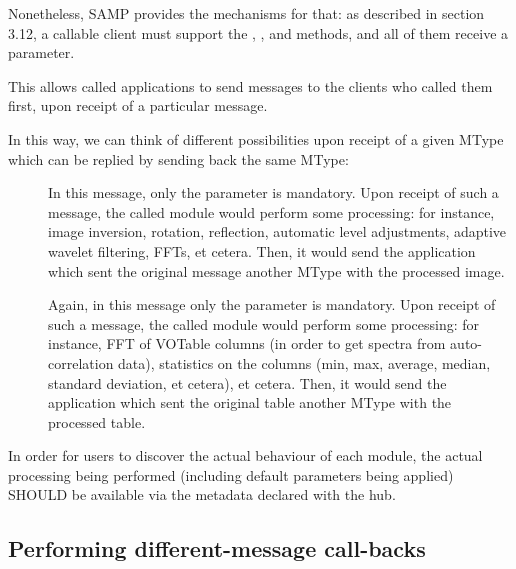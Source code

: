 			Nonetheless, SAMP provides the mechanisms for that:
			as described in section 3.12, a callable client must
			support the ,
			, and  methods, and
			all of them receive a  parameter.
			
			This allows called applications to send messages to
			the clients who called them first, upon receipt of a
			particular message.
			
			In this way, we can think of different possibilities
			upon receipt of a given MType which can be replied by
			sending back the same MType:
			
			\begin{description}
				\item[] In this message,
				only the  parameter is mandatory. Upon
				receipt of such a message, the called module would
				perform some processing: for instance, image
				inversion, rotation, reflection, automatic level
				adjustments, adaptive wavelet filtering, FFTs,
				et cetera. Then, it would send the application
				which sent the original message another
				 MType with the processed
				image.
				
				\item[] Again, in this
				message only the  parameter is
				mandatory. Upon receipt of such a message, the
				called module would perform some processing: for
				instance, FFT of VOTable columns (in order to
				get spectra from auto-correlation data), statistics
				on the columns (min, max, average, median, standard
				deviation, et cetera), et cetera. Then, it would
				send the application which sent the original table
				another  MType with 
				the processed table.
			\end{description}
			
			In order for users to discover the actual behaviour of
			each module, the actual processing being performed
			(including default parameters being applied) SHOULD be
			available via the  metadata
			declared with the hub.
			
		
		\subsection{Performing different-message call-backs} %
		\label{sub:performing_different_message_call_backs}
			
